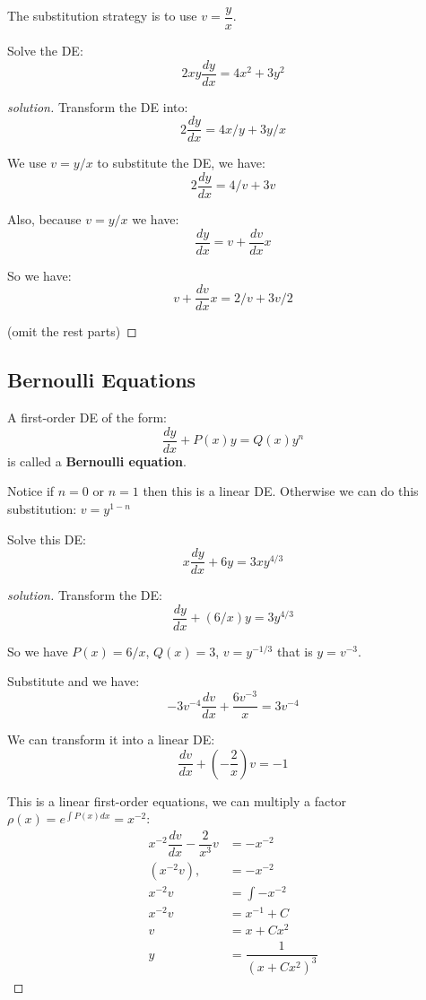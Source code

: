 The substitution strategy is to use \(v = \dfrac{y}{x}\). 

\begin{example}
    Solve the DE:
    \[
        2xy \dfrac{dy}{dx} = 4 x^2 + 3 y^2
    \]
\end{example}
\begin{proof}[solution]
    Transform the DE into:
    \[
        2\dfrac{dy}{dx} = 4 x/y + 3 y/x
    \]

    We use \(v = y/x\) to substitute the DE, we have:
    \[
        2 \dfrac{dy}{dx} = 4/v + 3v
    \]

    Also, because \(v = y/x\) we have:
    \[
        \dfrac{dy}{dx} = v + \dfrac{dv}{dx} x
    \]

    So we have:
    \[
        v + \dfrac{dv}{dx} x = 2/v + 3v/2
    \]

    (omit the rest parts)
\end{proof}

\subsection{Bernoulli Equations}

\begin{definition}
    A first-order DE of the form:
    \[
        \dfrac{dy}{dx} + P(x) y = Q(x) y^n
    \]
    is called a \textbf{Bernoulli equation}.

    Notice if \(n = 0\) or \(n = 1\) then this is a linear DE.  
    Otherwise we can do this substitution: \(v = y^{1-n}\) 
\end{definition}

\begin{example}
    Solve this DE:
    \[
        x \dfrac{dy}{dx} + 6y = 3xy^{4/3}
    \]
\end{example}
\begin{proof}[solution]
    Transform the DE:
    \[
        \dfrac{dy}{dx} + (6/x) y = 3 y^{4/3}
    \]

    So we have \(P(x) = 6/x\), \(Q(x) = 3\), \(v = y ^{-1/3}\) that is \(y = v^{-3}\). 

    Substitute and we have:
    \[
        -3v^{-4}\dfrac{dv}{dx} + \dfrac{6v^{-3}}{x} = 3v^{-4}
    \]

    We can transform it into a linear DE:
    \[
        \dfrac{dv}{dx} + (-\dfrac{2}{x}) v = -1
    \]

    This is a linear first-order equations, we can multiply a factor \(\rho(x) = e^{\int P(x) dx} = x^{-2}\):
    \begin{align*}
        x^{-2} \dfrac{dv}{dx} - \dfrac{2}{x^3} v &= -x^{-2} \\
        (x^{-2}v), &= -x^{-2} \\
        x^{-2} v & = \int -x^{-2} \\
        x^{-2} v & = x^{-1} + C \\
        v & = x + Cx^2 \\
        y &=  \dfrac{1}{(x + Cx^2) ^ 3}
    \end{align*}
\end{proof}

